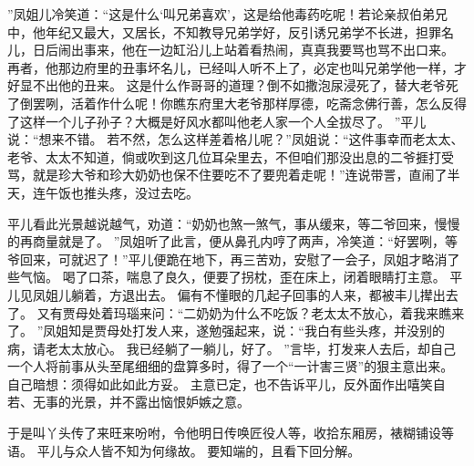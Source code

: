 ”凤姐儿冷笑道：“这是什么‘叫兄弟喜欢’，这是给他毒药吃呢！若论亲叔伯弟兄中，他年纪又最大，又居长，不知教导兄弟学好，反引诱兄弟学不长进，担罪名儿，日后闹出事来，他在一边缸沿儿上站着看热闹，真真我要骂也骂不出口来。
再者，他那边府里的丑事坏名儿，已经叫人听不上了，必定也叫兄弟学他一样，才好显不出他的丑来。
这是什么作哥哥的道理？倒不如撒泡尿浸死了，替大老爷死了倒罢咧，活着作什么呢！你瞧东府里大老爷那样厚德，吃斋念佛行善，怎么反得了这样一个儿子孙子？大概是好风水都叫他老人家一个人全拔尽了。
”平儿说：“想来不错。
若不然，怎么这样差着格儿呢？”凤姐说：“这件事幸而老太太、老爷、太太不知道，倘或吹到这几位耳朵里去，不但咱们那没出息的二爷捱打受骂，就是珍大爷和珍大奶奶也保不住要吃不了要兜着走呢！”连说带詈，直闹了半天，连午饭也推头疼，没过去吃。
\par
平儿看此光景越说越气，劝道：“奶奶也煞一煞气，事从缓来，等二爷回来，慢慢的再商量就是了。
”凤姐听了此言，便从鼻孔内哼了两声，冷笑道：“好罢咧，等爷回来，可就迟了！”平儿便跪在地下，再三苦劝，安慰了一会子，凤姐才略消了些气恼。
喝了口茶，喘息了良久，便要了拐枕，歪在床上，闭着眼睛打主意。
平儿见凤姐儿躺着，方退出去。
偏有不懂眼的几起子回事的人来，都被丰儿撵出去了。
又有贾母处着玛瑙来问：“二奶奶为什么不吃饭？老太太不放心，着我来瞧来了。
”凤姐知是贾母处打发人来，遂勉强起来，说：“我白有些头疼，并没别的病，请老太太放心。
我已经躺了一躺儿，好了。
”言毕，打发来人去后，却自己一个人将前事从头至尾细细的盘算多时，得了一个“一计害三贤”的狠主意出来。
自己暗想：须得如此如此方妥。
主意已定，也不告诉平儿，反外面作出嘻笑自若、无事的光景，并不露出恼恨妒嫉之意。
\par
于是叫丫头传了来旺来吩咐，令他明日传唤匠役人等，收拾东厢房，裱糊铺设等语。
平儿与众人皆不知为何缘故。
要知端的，且看下回分解。
